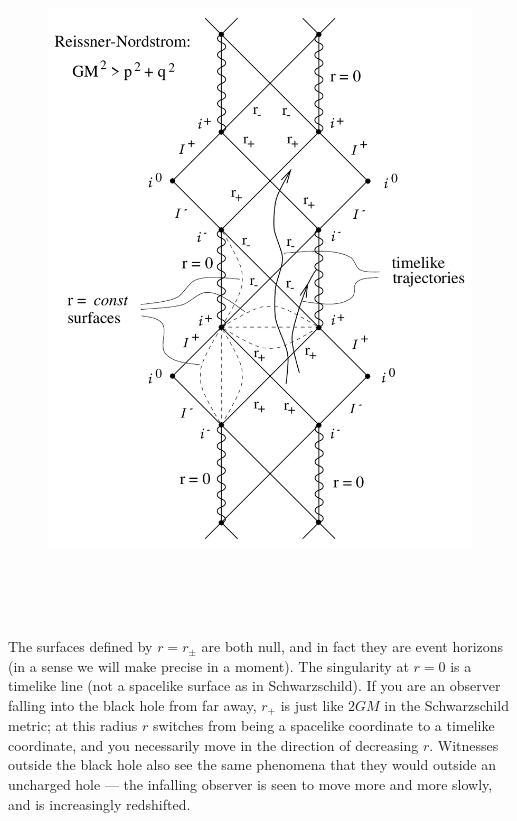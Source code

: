 \documentclass[12pt]{article}
\begin{document}
\begin{figure}[p]
  \centerline{
  \includegraphics[height=18cm]{pdf/seven30}}
\end{figure}

The surfaces defined by $r=r_\pm$ are both null, and in fact they
are event horizons (in a sense we will make precise in a moment).
The singularity at $r=0$ is a timelike line (not a spacelike
surface as in Schwarzschild).  If you are an observer falling into the 
black hole from far away, $r_+$ is just like $2GM$ in the Schwarzschild
metric; at this radius $r$ switches from being a spacelike coordinate
to a timelike coordinate, and you necessarily move in the
direction of decreasing $r$.  Witnesses outside the black hole also
see the same phenomena that they would outside an uncharged hole ---
the infalling observer is seen to move more and more slowly, and
is increasingly redshifted.
\end{document}
